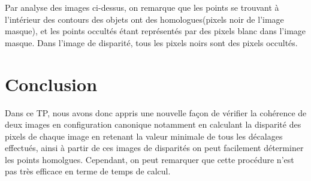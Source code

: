 \documentclass[a4paper,12pt]{report}
\begin{document}
\noindent Par analyse des images ci-dessus, on remarque que les points se trouvant à l'intérieur des contours des objets ont des homologues(pixels noir de l'image masque), et les points occultés étant représentés par des pixels blanc dans l'image masque. Dans l'image de disparité, tous les pixels noirs sont des pixels occultés.
\section*{Conclusion}
Dans ce TP, nous avons donc appris une nouvelle façon de vérifier la cohérence de deux images en configuration canonique notamment en calculant la disparité des pixels de chaque image en retenant la valeur minimale de tous les décalages effectués, ainsi à partir de ces images de disparités on peut facilement déterminer les points homolgues. Cependant, on peut remarquer que cette procédure n'est pas très efficace en terme de temps de calcul.
\end{document}
